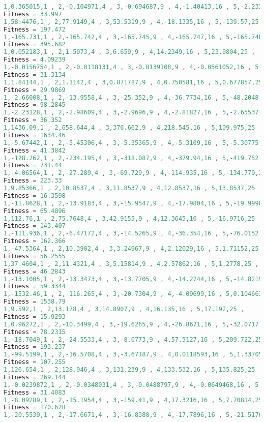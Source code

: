 \documentclass[10pt,b5paper]{article}
\begin{document}
\begin{lstlisting}[language=c++]
1,0.365015,1 , 2,-0.104971,4 , 3,-0.694687,9 , 4,-1.40413,16 , 5,-2.23331,25 , 
Fitness = 33.997
1,58.4476,1 , 2,77.9149,4 , 3,53.5319,9 , 4,-18.1335,16 , 5,-139.57,25 , 
Fitness = 197.472
1,-165.731,1 , 2,-165.742,4 , 3,-165.745,9 , 4,-165.747,16 , 5,-165.748,25 , 
Fitness = 395.682
1,0.052183,1 , 2,1.5073,4 , 3,6.659,9 , 4,14.2349,16 , 5,23.9804,25 , 
Fitness = 4.09239
1,-0.0156754,1 , 2,-0.0118131,4 , 3,-0.0139108,9 , 4,-0.0561052,16 , 5,0.0129643,25 , 
Fitness = 31.3134
1,1.84144,1 , 2,1.1142,4 , 3,0.871787,9 , 4,0.750581,16 , 5,0.677857,25 , 
Fitness = 29.9869
1,-2.66008,1 , 2,-13.9558,4 , 3,-25.352,9 , 4,-36.7734,16 , 5,-48.2048,25 , 
Fitness = 98.2845
1,-2.23128,1 , 2,-2.98609,4 , 3,-2.9696,9 , 4,-2.81827,16 , 5,-2.65537,25 , 
Fitness = 36.352
1,1436.09,1 , 2,658.644,4 , 3,376.662,9 , 4,218.545,16 , 5,109.975,25 , 
Fitness = 1634.46
1,-5.67442,1 , 2,-5.45306,4 , 3,-5.35365,9 , 4,-5.3109,16 , 5,-5.30775,25 , 
Fitness = 41.3842
1,-128.262,1 , 2,-234.195,4 , 3,-318.087,9 , 4,-379.94,16 , 5,-419.752,25 , 
Fitness = 731.44
1,-4.06564,1 , 2,-27.289,4 , 3,-69.729,9 , 4,-114.935,16 , 5,-134.779,25 , 
Fitness = 223.33
1,9.85366,1 , 2,10.8537,4 , 3,11.8537,9 , 4,12.8537,16 , 5,13.8537,25 , 
Fitness = 16.3598
1,-11.8628,1 , 2,-13.9183,4 , 3,-15.9547,9 , 4,-17.9804,16 , 5,-19.9996,25 , 
Fitness = 65.4896
1,112.76,1 , 2,75.7648,4 , 3,42.9155,9 , 4,12.3645,16 , 5,-16.9716,25 , 
Fitness = 143.407
1,-111.936,1 , 2,-6.47172,4 , 3,-14.5265,9 , 4,-36.354,16 , 5,-76.0152,25 , 
Fitness = 162.366
1,-47.5364,1 , 2,10.3902,4 , 3,3.24967,9 , 4,2.12029,16 , 5,1.71152,25 , 
Fitness = 56.2555
1,37.4604,1 , 2,11.4321,4 , 3,5.15814,9 , 4,2.57862,16 , 5,1.2778,25 , 
Fitness = 46.2843
1,-13.1005,1 , 2,-13.3473,4 , 3,-13.7705,9 , 4,-14.2744,16 , 5,-14.8219,25 , 
Fitness = 59.3344
1,-1532.46,1 , 2,-116.265,4 , 3,-20.7304,9 , 4,-4.09699,16 , 5,0.104663,25 , 
Fitness = 1538.79
1,9.592,1 , 2,13.178,4 , 3,14.8907,9 , 4,16.135,16 , 5,17.192,25 , 
Fitness = 15.9293
1,0.96272,1 , 2,-10.3499,4 , 3,-19.6265,9 , 4,-26.8671,16 , 5,-32.0717,25 , 
Fitness = 78.2315
1,-18.7049,1 , 2,-24.5533,4 , 3,-8.0773,9 , 4,57.5127,16 , 5,209.722,25 , 
Fitness = 193.237
1,-99.5199,1 , 2,-16.5708,4 , 3,-3.67187,9 , 4,0.0118593,16 , 5,1.33705,25 , 
Fitness = 107.255
1,126.654,1 , 2,128.946,4 , 3,131.239,9 , 4,133.532,16 , 5,135.825,25 , 
Fitness = 269.144
1,-0.0239872,1 , 2,-0.0348031,4 , 3,-0.0488797,9 , 4,-0.0649468,16 , 5,-0.0836736,25 , 
Fitness = 31.4083
1,-8.09289,1 , 2,-15.1954,4 , 3,-159.41,9 , 4,17.3216,16 , 5,7.70814,25 , 
Fitness = 170.628
1,-20.5539,1 , 2,-17.6671,4 , 3,-16.8388,9 , 4,-17.7896,16 , 5,-21.5176,25 , 

\end{lstlisting}
\end{document}
